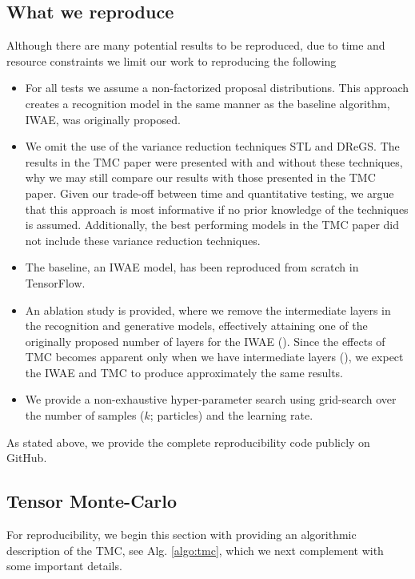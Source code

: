 \subsection{What we reproduce}
Although there are many potential results to be reproduced, due to time and resource constraints we limit our work to reproducing the following
\begin{itemize}
    \item For all tests we assume a non-factorized proposal distributions. This approach creates a recognition model in the same manner as the baseline algorithm, IWAE, was originally proposed.
    \item We omit the use of the variance reduction techniques STL and DReGS. The results in the TMC paper were presented with and without these techniques, why we may still compare our results with those presented in the TMC paper. Given our trade-off between time and quantitative testing, we argue that this approach is most informative if no prior knowledge of the techniques is assumed. Additionally, the best performing models in the TMC paper did not include these variance reduction techniques.
    \item The baseline, an IWAE model, has been reproduced from scratch in TensorFlow.
    \item An ablation study is provided, where we remove the intermediate layers in the recognition and generative models, effectively attaining one of the originally proposed number of layers for the IWAE (\cite{iwae}). Since the effects of TMC becomes apparent only when we have intermediate layers (\cite{tmc}), we expect the IWAE and TMC to produce approximately the same results.
    \item We provide a non-exhaustive hyper-parameter search using grid-search over the number of samples ($k$; particles) and the learning rate.
\end{itemize}
As stated above, we provide the complete reproducibility code publicly on GitHub. 

\subsection{Tensor Monte-Carlo}
For reproducibility, we begin this section with providing an algorithmic description of the TMC, see Alg. \ref{algo:tmc}, which we next complement with some important details.


